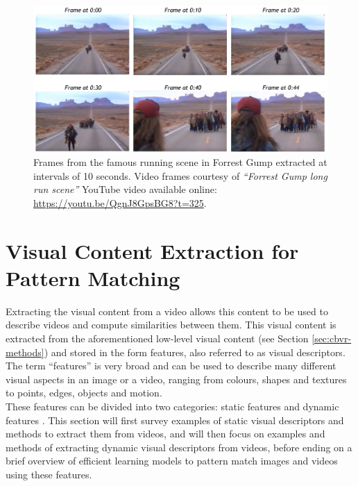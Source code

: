 \begin{figure}[h]
\centerline{\includegraphics[width=\textwidth]{figures/litsurvey/forrest_gump_shot.jpg}}
\caption{\label{fig:forrest_gump_frames}Frames from the famous running scene in Forrest Gump extracted at intervals of 10 seconds. Video frames courtesy of \textit{``Forrest Gump long run scene''} YouTube video available online: \url{https://youtu.be/QgnJ8GpsBG8?t=325}.}
\end{figure}

\section{Visual Content Extraction for Pattern Matching}
\label{sec:visual-content-extraction}

Extracting the visual content from a video allows this content to be used to describe videos and compute similarities between them. This visual content is extracted from the aforementioned low-level visual content (see Section \ref{sec:cbvr-methods}) \cite{petkovic2000} and stored in the form features, also referred to as visual descriptors. The term ``features'' is very broad and can be used to describe many different visual aspects in an image or a video, ranging from colours, shapes and textures to points, edges, objects and motion.\\

These features can be divided into two categories: static features and dynamic features \cite{petkovic2000}. This section will first survey examples of static visual descriptors and methods to extract them from videos, and will then focus on examples and methods of extracting dynamic visual descriptors from videos, before ending on a brief overview of efficient learning models to pattern match images and videos using these features.

